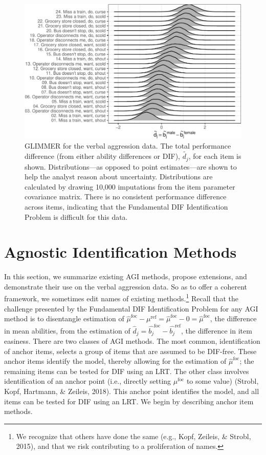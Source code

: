 \documentclass[
  english,
  man,floatsintext]{apa6}
\begin{document}
\begin{figure}[H]

{\centering \includegraphics{paper_apa_files/figure-latex/emmilg-1}

}

\caption{GLIMMER for the verbal aggression data. The total performance difference (from either ability differences or DIF), $\tilde{{d_j}}$, for each item is shown. Distributions—as opposed to point estimates—are shown to help the analyst reason about uncertainty. Distributions are calculated by drawing 10,000 imputations from the item parameter covariance matrix. There is no consistent performance difference across items, indicating that the Fundamental DIF Identification Problem is difficult for this data.}\label{fig:emmilg}
\end{figure}

\hypertarget{aimethods}{%
\section{Agnostic Identification Methods}\label{aimethods}}

In this section, we summarize existing AGI methods, propose extensions, and demonstrate their use on the verbal aggression data. So as to offer a coherent framework, we sometimes edit names of existing methods.\footnote{We recognize that others have done the same (e.g., Kopf, Zeileis, \& Strobl, 2015), and that we risk contributing to a proliferation of names.} Recall that the challenge presented by the Fundamental DIF Identification Problem for any AGI method is to disentangle estimation of \(\hat\mu^\text{foc} - \mu^\text{ref} = \hat\mu^\text{foc} - 0 = \hat\mu^\text{foc}\), the difference in mean abilities, from the estimation of \(\hat d_j = \hat{b_j}^{\text{foc}} - \hat{b_j}^{\text{ref}}\), the difference in item easiness. There are two classes of AGI methods. The most common, identification of anchor items, selects a group of items that are assumed to be DIF-free. These anchor items identify the model, thereby allowing for the estimation of \(\hat\mu^\text{foc}\); the remaining items can be tested for DIF using an LRT. The other class involves identification of an anchor point (i.e., directly setting \(\mu^{\text{foc}}\) to some value) (Strobl, Kopf, Hartmann, \& Zeileis, 2018). This anchor point identifies the model, and all items can be tested for DIF using an LRT. We begin by describing anchor item methods.
\end{document}
